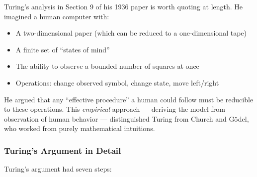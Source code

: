 Turing's analysis in Section 9 of his 1936 paper is worth quoting at length. He imagined a human computer with:
\begin{itemize}
\item A two-dimensional paper (which can be reduced to a one-dimensional tape)
\item A finite set of ``states of mind''
\item The ability to observe a bounded number of squares at once
\item Operations: change observed symbol, change state, move left/right
\end{itemize}

He argued that any ``effective procedure'' a human could follow must be reducible to these operations. This \emph{empirical} approach --- deriving the model from observation of human behavior --- distinguished Turing from Church and G\"odel, who worked from purely mathematical intuitions.

\subsubsection*{Turing's Argument in Detail}

Turing's argument had seven steps:

